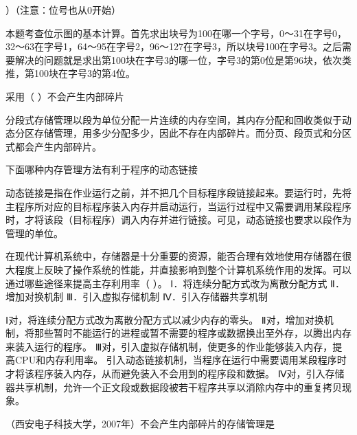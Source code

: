 ）（注意：位号也从0开始）
\par{}
\begin{solution}本题考查位示图的基本计算。首先求出块号为100在哪一个字号，0～31在字号0，32～63在字号1，64～95在字号2，96～127在字号3，所以块号100在字号3。之后需要解决的问题就是求出第100块在字号3的哪一位，字号3的第0位是第96块，依次类推，第100块在字号3的第4位。
\end{solution}
\question 采用（ ）不会产生内部碎片
\par{}
\begin{solution}分段式存储管理以段为单位分配一片连续的内存空间，其内存分配和回收类似于动态分区存储管理，用多少分配多少，因此不存在内部碎片。而分页、段页式和分区式都会产生内部碎片。
\end{solution}
\question 下面哪种内存管理方法有利于程序的动态链接
\par{}
\begin{solution}动态链接是指在作业运行之前，并不把几个目标程序段链接起来。要运行时，先将主程序所对应的目标程序装入内存并启动运行，当运行过程中又需要调用某段程序时，才将该段（目标程序）调入内存并进行链接。可见，动态链接也要求以段作为管理的单位。
\end{solution}
\question 在现代计算机系统中，存储器是十分重要的资源，能否合理有效地使用存储器在很大程度上反映了操作系统的性能，并直接影响到整个计算机系统作用的发挥。可以通过哪些途径来提高主存利用率（
）。 Ⅰ．将连续分配方式改为离散分配方式 Ⅱ．增加对换机制
Ⅲ．引入虚拟存储机制 Ⅳ．引入存储器共享机制
\par{}
\begin{solution}Ⅰ对，将连续分配方式改为离散分配方式以减少内存的零头。
Ⅱ对，增加对换机制，将那些暂时不能运行的进程或暂不需要的程序或数据换出至外存，以腾出内存来装入运行的程序。
Ⅲ对，引入虚拟存储机制，使更多的作业能够装入内存，提高CPU和内存利用率。
引入动态链接机制，当程序在运行中需要调用某段程序时才将该程序装入内存，从而避免装入不会用到的程序段和数据。
Ⅳ对，引入存储器共享机制，允许一个正文段或数据段被若干程序共享以消除内存中的重复拷贝现象。
\end{solution}
\question （西安电子科技大学，2007年）不会产生内部碎片的存储管理是
\par{}
